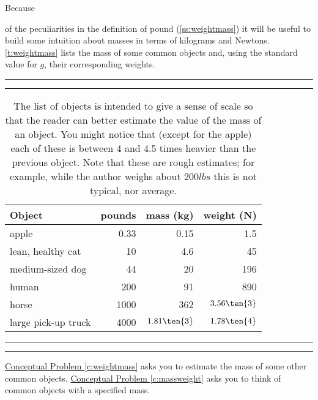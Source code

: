 \documentclass[11pt,letter,openany,makeidx]{book}
\newcommand{\linkreturn}[2][a related idea]{{}\hfill \mbox{Return to the discussion of \protect{\hyperlink{#2}{#1}}.}}
\begin{document}
\hypertarget{d:weightmass}{Because} of the peculiarities in the definition of pound (\autoref{ss:weightmass}) it will be useful to build some intuition about masses in terms of kilograms and Newtons.  \autoref{t:weightmass} lists the mass of some common objects and, using the standard value for $g$, their corresponding weights.
%
\begin{table}[bhtp]
\hrule\hrule
\begin{center}
\caption[Comparison of masses and weights of common objects]{\label{t:weightmass} The list of objects is intended to give a sense of scale so that the reader can better estimate the value of the mass of an object.  You might notice that (except for the apple) each of these is between 4 and 4.5 times heavier than the previous object.  Note that these are rough estimates; for example, while the author weighs about $200\unit{lbs}$ this is not typical, nor average.
}
\begin{tabular}{lrrr}
Object & pounds & mass (kg) & weight (N) \\ \hline
apple & 0.33 & 0.15 & 1.5 \\
lean, healthy cat & 10 & 4.6 & 45 \\
medium-sized dog & 44 & 20 & 196 \\
human & 200 & 91 & 890 \\
horse & 1000 & 362 & $3.56\ten{3}$ \\
large pick-up truck & 4000 & $1.81\ten{3}$ & $1.78\ten{4}$
\end{tabular}
\end{center}
\hrule\hrule
\end{table}
%
\hyperref[c:weightmass]{Conceptual Problem \ref{c:weightmass}} asks you to estimate the mass of some other common objects.  \hyperref[c:massweight]{Conceptual Problem \ref{c:massweight}} asks you to think of common objects with a specified mass.
\end{document}
